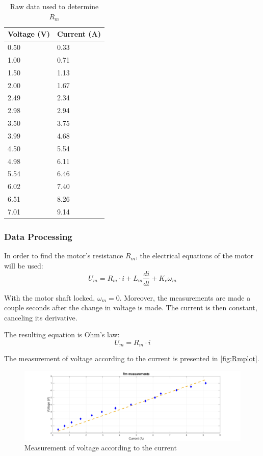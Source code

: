 \begin{table}[htbp]
	\centering
	\caption{Raw data used to determine $R_m$}\label{tab_appendix:RmData}
	\begin{tabularx}{0.35\textwidth}{XX}
		Voltage (V) & Current (A)\\ \toprule \rowcolor{lightGrey}
		0.50 & 0.33 \\
		1.00 & 0.71 \\ \rowcolor{lightGrey}
		1.50 & 1.13 \\
		2.00 & 1.67 \\ \rowcolor{lightGrey}
		2.49 & 2.34 \\
		2.98 & 2.94 \\ \rowcolor{lightGrey}
		3.50 & 3.75 \\
		3.99 & 4.68 \\ \rowcolor{lightGrey}
		4.50 & 5.54 \\
		4.98 & 6.11 \\ \rowcolor{lightGrey}
		5.54 & 6.46 \\
		6.02 & 7.40 \\ \rowcolor{lightGrey}
		6.51 & 8.26 \\
		7.01 & 9.14 
	\end{tabularx}
\end{table}

\subsubsection{Data Processing}
In order to find the motor's resistance $R_m$, the electrical equations of the motor will be used:
\begin{equation}
	U_m = R_m \cdot i + L_m \frac{di}{dt} + K_e\omega_m
\end{equation}

With the motor shaft locked, $\omega_m = 0$. Moreover, the measurements are made a couple seconds after the change in voltage is made. The current is then constant, canceling its derivative. 

The resulting equation is Ohm's law:
\begin{equation}
U_m = R_m \cdot i
\end{equation}


The measurement of voltage according to the current is presented in \autoref{fig:Rmplot}.
\begin{figure}[htbp]
	\includegraphics[width=1\textwidth]{figures/appendix/Motor&GearTests/plotRm}
	\caption{Measurement of voltage according to the current} \label{fig:Rmplot}
\end{figure}

